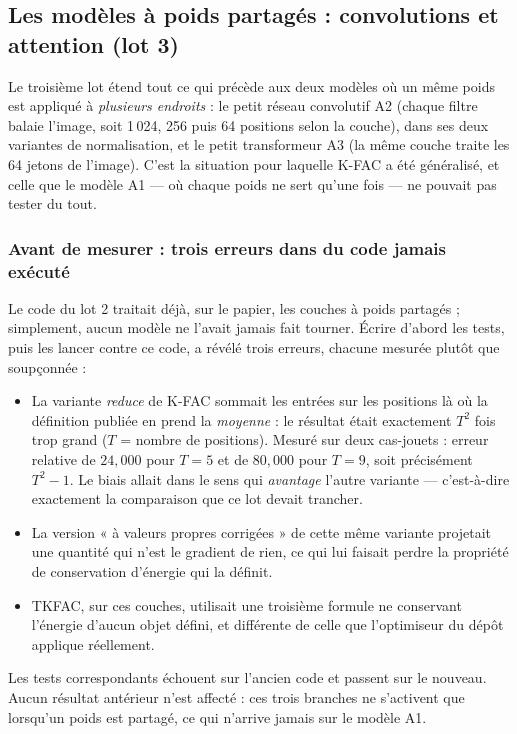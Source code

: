 \documentclass[11pt,a4paper]{article}
\newcommand{\eng}[1]{\emph{#1}}
\begin{document}
\subsection{Les modèles à poids partagés : convolutions et attention (lot 3)}
\label{sec:lot3}

Le troisième lot étend tout ce qui précède aux deux modèles où un même poids est appliqué à
\emph{plusieurs endroits} : le petit réseau convolutif A2 (chaque filtre balaie l'image, soit 1\,024,
256 puis 64 positions selon la couche), dans ses deux variantes de normalisation, et le petit
transformeur A3 (la même couche traite les 64 jetons de l'image). C'est la situation pour laquelle
K-FAC a été généralisé, et celle que le modèle A1 — où chaque poids ne sert qu'une fois — ne pouvait
pas tester du tout.

\subsubsection*{Avant de mesurer : trois erreurs dans du code jamais exécuté}

Le code du lot 2 traitait déjà, sur le papier, les couches à poids partagés ; simplement, aucun
modèle ne l'avait jamais fait tourner. Écrire d'abord les tests, puis les lancer contre ce code, a
révélé trois erreurs, chacune mesurée plutôt que soupçonnée :

\begin{mesure}
\begin{itemize}[leftmargin=1.3em]
\item La variante \eng{reduce} de K-FAC sommait les entrées sur les positions là où la définition
publiée en prend la \emph{moyenne} : le résultat était exactement $T^2$ fois trop grand ($T$ = nombre
de positions). Mesuré sur deux cas-jouets : erreur relative de $24{,}000$ pour $T=5$ et de
$80{,}000$ pour $T=9$, soit précisément $T^2-1$. Le biais allait dans le sens qui \emph{avantage}
l'autre variante — c'est-à-dire exactement la comparaison que ce lot devait trancher.
\item La version « à valeurs propres corrigées » de cette même variante projetait une quantité qui
n'est le gradient de rien, ce qui lui faisait perdre la propriété de conservation d'énergie qui la
définit.
\item TKFAC, sur ces couches, utilisait une troisième formule ne conservant l'énergie d'aucun objet
défini, et différente de celle que l'optimiseur du dépôt applique réellement.
\end{itemize}
Les tests correspondants échouent sur l'ancien code et passent sur le nouveau. Aucun résultat
antérieur n'est affecté : ces trois branches ne s'activent que lorsqu'un poids est partagé, ce qui
n'arrive jamais sur le modèle A1.
\end{mesure}
\end{document}
